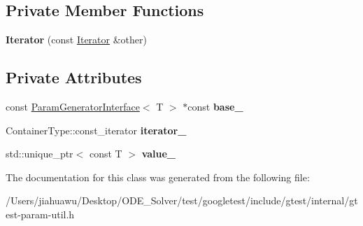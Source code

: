 \subsection*{Private Member Functions}
\begin{DoxyCompactItemize}
\item 
\mbox{\label{classtesting_1_1internal_1_1_values_in_iterator_range_generator_1_1_iterator_a87cadeed020bb8bfbdce636fca31b9ef}} 
{\bfseries Iterator} (const \mbox{\hyperlink{classtesting_1_1internal_1_1_values_in_iterator_range_generator_1_1_iterator}{Iterator}} \&other)
\end{DoxyCompactItemize}
\subsection*{Private Attributes}
\begin{DoxyCompactItemize}
\item 
\mbox{\label{classtesting_1_1internal_1_1_values_in_iterator_range_generator_1_1_iterator_a904df7e46beda1ce5ac2c0ecd6680e0d}} 
const \mbox{\hyperlink{classtesting_1_1internal_1_1_param_generator_interface}{Param\+Generator\+Interface}}$<$ T $>$ $\ast$const {\bfseries base\+\_\+}
\item 
\mbox{\label{classtesting_1_1internal_1_1_values_in_iterator_range_generator_1_1_iterator_aaff15b9f8addac71b91c32053bf9ea1e}} 
Container\+Type\+::const\+\_\+iterator {\bfseries iterator\+\_\+}
\item 
\mbox{\label{classtesting_1_1internal_1_1_values_in_iterator_range_generator_1_1_iterator_af51f1a21ffb0cd531de7574f4ad1f9b6}} 
std\+::unique\+\_\+ptr$<$ const T $>$ {\bfseries value\+\_\+}
\end{DoxyCompactItemize}


The documentation for this class was generated from the following file\+:\begin{DoxyCompactItemize}
\item 
/\+Users/jiahuawu/\+Desktop/\+O\+D\+E\+\_\+\+Solver/test/googletest/include/gtest/internal/gtest-\/param-\/util.\+h\end{DoxyCompactItemize}
